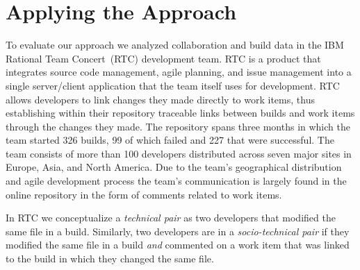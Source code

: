 \section{Applying the Approach}
To evaluate our approach we analyzed collaboration and build data in the IBM Rational Team Concert\texttrademark\ (RTC) development team.
RTC is a product that integrates source code management, agile planning, and issue management into a single server/client application that the team itself uses for development.
RTC allows developers to link changes they made directly to work items, thus establishing within their repository traceable links between builds and work items through the changes they made.
The repository spans three months in which the team started 326 builds, 99 of which failed and 227 that were successful. 
The team consists of more than 100 developers distributed across seven major sites in Europe, Asia, and North America. Due to the team's geographical distribution and agile development process the team's  communication is largely found in the online repository in the form of comments related to work items. 


In RTC we conceptualize a \emph{technical pair} as two developers that modified the same file in a build.
Similarly, two developers are in a \emph{socio-technical pair} if they modified the same file in a build \emph{and} commented on a work item that was linked to the build in which they changed the same file.

